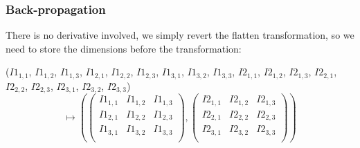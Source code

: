 \documentclass[11pt,a4paper]{report}
\begin{document}
\subsubsection{Back-propagation}
There is no derivative involved, we simply revert the flatten transformation, so we need to store the dimensions before the transformation:

($I1_{1,1}$, $I1_{1,2}$, $I1_{1,3}$, $I1_{2,1}$, $I1_{2,2}$, $I1_{2,3}$, $I1_{3,1}$, $I1_{3,2}$, $I1_{3,3}$, $I2_{1,1}$, $I2_{1,2}$, $I2_{1,3}$, $I2_{2,1}$, $I2_{2,2}$, $I2_{2,3}$, $I2_{3,1}$, $I2_{3,2}$, $I2_{3,3}$)
\begin{equation}
\mapsto
\left(\begin{pmatrix}
I1_{1,1} & I1_{1,2} & I1_{1,3} \\
I1_{2,1} & I1_{2,2} & I1_{2,3} \\
I1_{3,1} & I1_{3,2} & I1_{3,3} \\
\end{pmatrix},\begin{pmatrix}
I2_{1,1} & I2_{1,2} & I2_{1,3} \\
I2_{2,1} & I2_{2,2} & I2_{2,3} \\
I2_{3,1} & I2_{3,2} & I2_{3,3} \\
\end{pmatrix}\right)
\end{equation}
\end{document}
